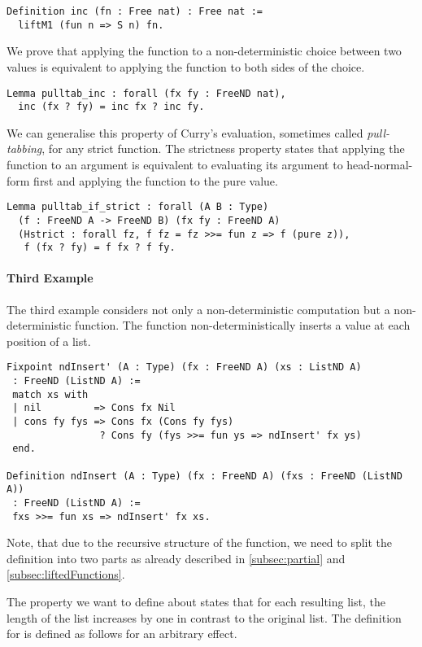 \begin{verbatim}
Definition inc (fn : Free nat) : Free nat :=
  liftM1 (fun n => S n) fn.
\end{verbatim}

We prove that applying the function  to a non-deterministic choice between two values is equivalent to applying the function to both sides of the choice.

\begin{verbatim}
Lemma pulltab_inc : forall (fx fy : FreeND nat),
  inc (fx ? fy) = inc fx ? inc fy.
\end{verbatim}

We can generalise this property of Curry's evaluation, sometimes called \emph{pull-tabbing}, for any strict function.
The strictness property states that applying the function to an argument is equivalent to evaluating its argument to head-normal-form first and applying the function to the pure value.

\begin{verbatim}
Lemma pulltab_if_strict : forall (A B : Type)
  (f : FreeND A -> FreeND B) (fx fy : FreeND A)
  (Hstrict : forall fz, f fz = fz >>= fun z => f (pure z)),
   f (fx ? fy) = f fx ? f fy.
\end{verbatim}


\paragraph{Third Example}
The third example considers not only a non-deterministic computation but a non-deterministic function.
The function  non-deterministically inserts a value at each position of a list.

\begin{verbatim}
Fixpoint ndInsert' (A : Type) (fx : FreeND A) (xs : ListND A)
 : FreeND (ListND A) :=
 match xs with
 | nil         => Cons fx Nil
 | cons fy fys => Cons fx (Cons fy fys)
                ? Cons fy (fys >>= fun ys => ndInsert' fx ys)
 end.

Definition ndInsert (A : Type) (fx : FreeND A) (fxs : FreeND (ListND A))
 : FreeND (ListND A) :=
 fxs >>= fun xs => ndInsert' fx xs.
\end{verbatim}

Note, that due to the recursive structure of the function, we need to split the definition into two parts as already described in \autoref{subsec:partial} and \autoref{subsec:liftedFunctions}.

The property we want to define about  states that for each resulting list, the length of the list increases by one in contrast to the original list.
The definition for  is defined as follows for an arbitrary effect.


